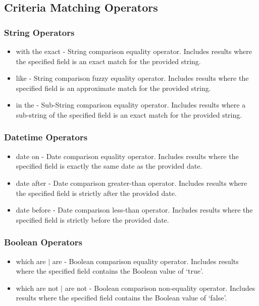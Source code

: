 \subsection{Criteria Matching Operators}
\subsubsection{String Operators}
\begin{itemize}
\item with the exact - String comparison equality operator. Includes results where the specified field is an exact match for the provided string.
\item like - String comparison fuzzy equality operator. Includes results where the specified field is an approximate match for the provided string.
\item in the - Sub-String comparison equality operator. Includes results where a sub-string of the specified field is an exact match for the provided string.
\end{itemize}
\subsubsection{Datetime Operators}
\begin{itemize}
\item date on - Date comparison equality operator. Includes results where the specified field is exactly the same date as the provided date.
\item date after - Date comparison greater-than operator. Includes results where the specified field is strictly after the provided date.
\item date before - Date comparison less-than operator. Includes results where the specified field is strictly before the provided date.
\end{itemize}
\subsubsection{Boolean Operators}
\begin{itemize}
\item which are $|$ are - Boolean comparison equality operator. Includes results where the specified field contains the Boolean value of `true'.
\item which are not $|$ are not - Boolean comparison non-equality operator. Includes results where the specified field contains the Boolean value of `false'.
\end{itemize}
